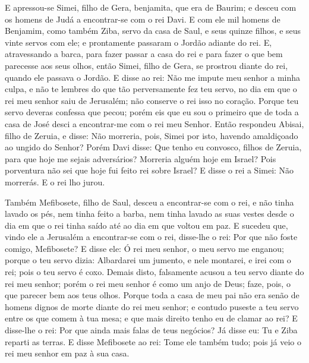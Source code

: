 E apressou-se Simei, filho de Gera, benjamita, que era de Baurim;
e desceu com os homens de Judá a encontrar-se com o rei Davi.
E com ele mil homens de Benjamim, como também Ziba, servo da
casa de Saul, e seus quinze filhos, e seus vinte servos com ele; e
prontamente passaram o Jordão adiante do rei. E, atravessando
a barca, para fazer passar a casa do rei e para fazer o que bem
parecesse aos seus olhos, então Simei, filho de Gera, se prostrou
diante do rei, quando ele passava o Jordão. E disse ao rei:
Não me impute meu senhor a minha culpa, e não te lembres do que tão
perversamente fez teu servo, no dia em que o rei meu senhor saiu de
Jerusalém; não conserve o rei isso no coração. Porque teu
servo deveras confessa que pecou; porém eis que eu sou o primeiro
que de toda a casa de José desci a encontrar-me com o rei meu
Senhor. Então respondeu Abisai, filho de Zeruia, e disse: Não
morreria, pois, Simei por isto, havendo amaldiçoado ao ungido do
Senhor? Porém Davi disse: Que tenho eu convosco, filhos de
Zeruia, para que hoje me sejais adversários? Morreria alguém hoje em
Israel? Pois porventura não sei que hoje fui feito rei sobre Israel?
E disse o rei a Simei: Não morrerás. E o rei lho jurou.

Também Mefibosete, filho de Saul, desceu a encontrar-se com o
rei, e não tinha lavado os pés, nem tinha feito a barba, nem tinha
lavado as suas vestes desde o dia em que o rei tinha saído até ao
dia em que voltou em paz. E sucedeu que, vindo ele a
Jerusalém a encontrar-se com o rei, disse-lhe o rei: Por que não
foste comigo, Mefibosete? E disse ele: Ó rei meu senhor, o
meu servo me enganou; porque o teu servo dizia: Albardarei um
jumento, e nele montarei, e irei com o rei; pois o teu servo é coxo.
Demais disto, falsamente acusou a teu servo diante do rei meu
senhor; porém o rei meu senhor é como um anjo de Deus; faze, pois, o
que parecer bem aos teus olhos. Porque toda a casa de meu pai
não era senão de homens dignos de morte diante do rei meu senhor; e
contudo puseste a teu servo entre os que comem à tua mesa; e que
mais direito tenho eu de clamar ao rei? E disse-lhe o rei:
Por que ainda mais falas de teus negócios? Já disse eu: Tu e Ziba
reparti as terras. E disse Mefibosete ao rei: Tome ele também
tudo; pois já veio o rei meu senhor em paz à sua casa.

